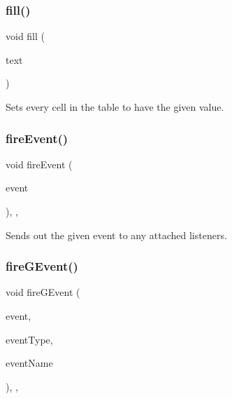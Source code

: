 \mbox{\label{classsgl_1_1GTable_a1ff40d0915f96652929cfb739bdd969f}} 
\subsubsection{\texorpdfstring{fill()}{fill()}}
{\footnotesize\ttfamily void fill (\begin{DoxyParamCaption}\item[{const std\+::string \&}]{text }\end{DoxyParamCaption})\hspace{0.3cm}{\ttfamily [virtual]}}



Sets every cell in the table to have the given value. 

\mbox{\label{classsgl_1_1GObservable_a63e5e5a6227c59c928493b11aceb0f67}} 
\subsubsection{\texorpdfstring{fire\+Event()}{fireEvent()}}
{\footnotesize\ttfamily void fire\+Event (\begin{DoxyParamCaption}\item[{\mbox{\hyperlink{classsgl_1_1GEvent}{G\+Event}} \&}]{event }\end{DoxyParamCaption})\hspace{0.3cm}{\ttfamily [protected]}, {\ttfamily [virtual]}, {\ttfamily [inherited]}}



Sends out the given event to any attached listeners. 

\mbox{\label{classsgl_1_1GObservable_ab3983ea07337b52020a29cc00c653d8d}} 
\subsubsection{\texorpdfstring{fire\+G\+Event()}{fireGEvent()}\hspace{0.1cm}{\footnotesize\ttfamily [1/8]}}
{\footnotesize\ttfamily void fire\+G\+Event (\begin{DoxyParamCaption}\item[{Q\+Event $\ast$}]{event,  }\item[{\mbox{\hyperlink{namespacesgl_a2628ea8d12e8b2563c32f05dc7fff6fa}{Event\+Type}}}]{event\+Type,  }\item[{const std\+::string \&}]{event\+Name }\end{DoxyParamCaption})\hspace{0.3cm}{\ttfamily [protected]}, {\ttfamily [virtual]}, {\ttfamily [inherited]}}



